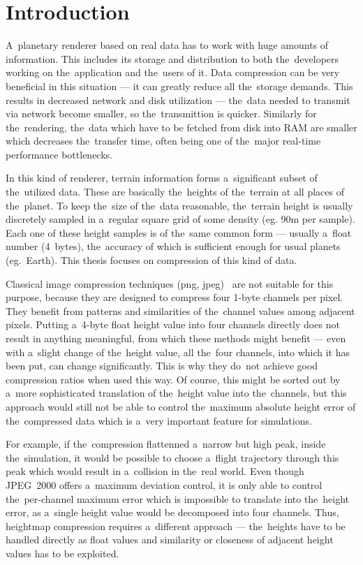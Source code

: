 \chapter*{Introduction}\label{chap:introduction}

A~planetary renderer based on real data has to work with huge amounts of information. This includes its storage and distribution to both the~developers working on the~application and the~users of it. Data compression can be very beneficial in this situation --- it can greatly reduce all the~storage demands. This results in decreased network and disk utilization --- the~data needed to transmit via network become smaller, so the~transmittion is quicker. Similarly for the~rendering, the~data which have to be fetched from disk into RAM are smaller which decreases the~transfer time, often being one of the~major real-time performance bottlenecks. 

In this kind of renderer, terrain information forms a~significant subset of the~utilized data. These are basically the~heights of the~terrain at all places of the~planet. To keep the~size of the~data reasonable, the~terrain height is usually discretely sampled in a~regular square grid of some density (eg. 90m per sample). Each one of these height samples is of the~same common form --- usually a~float number (4~bytes), the~accuracy of which is sufficient enough for usual planets (eg.~Earth). This thesis focuses on compression of this kind of data. 

Classical image compression techniques (png, jpeg)~\cite{jpeg, basicFormats} are not suitable for this purpose, because they are designed to compress four 1-byte channels per pixel. They benefit from patterns and similarities of the~channel values among adjacent pixels. Putting a~4-byte float height value into four channels directly does not result in anything meaningful, from which these methods might benefit ---  even with a~slight change of the~height value, all the~four channels, into which it has been put, can change significantly. This is why they do~not achieve good compression ratios when used this way. Of course, this might be sorted out by a~more sophisticated translation of the~height value into the~channels, but this approach would still not be able to control the~maximum absolute height error of the~compressed data which is a~very important feature for simulations. 

For example, if the~compression flattenned a~narrow but high peak, inside the~simulation, it would be possible to choose a~flight trajectory through this peak which would result in a~collision in the~real world. Even though JPEG~2000 offers a~maximum deviation control, it is only able to control the~per-channel maximum error which is impossible to translate into the~height error, as a~single height value would be decomposed into four channels. Thus, heightmap compression requires a~different approach --- the~heights have to be handled directly as float values and similarity or closeness of adjacent height values has to be exploited.

